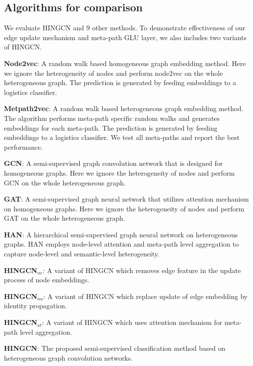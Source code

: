 \subsection{Algorithms for comparison}
\label{sec:algo-comp}
We evaluate HINGCN and 9 other methods. To demonstrate effectiveness of our edge update mechanism and meta-path GLU layer, we also includes two variants of HINGCN.

\noindent{\small$\bullet$}
\textbf{Node2vec\cite{GroverL16}}: A random walk based homogeneous graph embedding method. Here we ignore the heterogeneity of nodes and perform node2vec on the whole heterogeneous graph. The prediction is generated by feeding embeddings to a logistics classifier.

\noindent{\small$\bullet$}
\textbf{Metpath2vec\cite{DongCS17}}: A random walk based heterogeneous graph embedding method. The algorithm performs meta-path specific random walks and generates embeddings for each meta-path. The prediction is generated by feeding embeddings to a logistics classifier. We test all meta-paths and report the best performance.

\noindent{\small$\bullet$}
\textbf{GCN\cite{KipfW17}}: A semi-supervised graph convolution network that is designed for homogeneous graphs. Here we ignore the heterogeneity of nodes and perform GCN on the whole heterogeneous graph. 

\noindent{\small$\bullet$}
\textbf{GAT\cite{VelickovicCCRLB18}}: A semi-supervised graph neural network that utilizes attention mechanism on homogeneous graphs. Here we ignore the heterogeneity of nodes and perform GAT on the whole heterogeneous graph. 

\noindent{\small$\bullet$}
\textbf{HAN\cite{WangJSWYCY19}}:
A hierarchical semi-supervised graph neural network on heterogeneous graphs. HAN employs node-level attention and meta-path level aggregation to capture node-level and semantic-level heterogeneity.

\noindent{\small$\bullet$}
\textbf{HINGCN$_{ne}$}: 
A variant of HINGCN which removes edge feature in the update process of node embeddings.

\noindent{\small$\bullet$}
\textbf{HINGCN$_{nu}$}: 
A variant of HINGCN which replace update of edge embedding by identity propagation.

\noindent{\small$\bullet$}
\textbf{HINGCN$_{at}$}:
A variant of HINGCN which uses attention mechanism for meta-path level aggregation.

\noindent{\small$\bullet$}
\textbf{HINGCN}:
The proposed semi-supervised classification method based on heterogeneous graph convolution networks.


